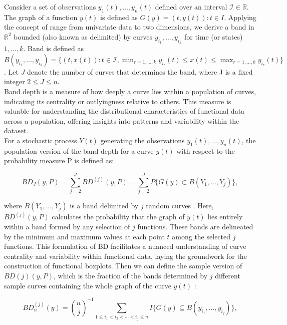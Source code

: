 \documentclass{article}\usepackage[]{graphicx}\usepackage[]{xcolor}
\numberwithin{equation}{section}
\begin{document}
\noindent
Consider a set of observations ${y_1(t),\dots,y_n(t)}$ defined over an interval $\mathcal{I} \in \mathbb{R}$. The graph of a function $y(t)$ is defined as $G(y) = {(t,y(t)) : t \in I}$. Applying the concept of range from univariate data to two dimensions, we derive a band in $\mathbb{R}^2$ bounded (also known as delimited) by curves $y_{i_1},\dots, y_{i_k}$ for time (or states) $1, \dots, k$. Band is defined as $B(y_{i_1},\dots,y_{i_k}) = \{(t,x(t)): t \in \mathcal{I}, \min_{r=1,\dots,k} y_{i_r}(t) \leq x(t) \leq \max_{r=1,\dots,k} y_{i_r}(t)\}$. Let $J$ denote the number of curves that determines the band, where J is a fixed integer $2 \le J \le n$.\\

\noindent
Band depth is a measure of how deeply a curve lies within a population of curves, indicating its centrality or outlyingness relative to others. This measure is valuable for understanding the distributional characteristics of functional data across a population, offering insights into patterns and variability within the dataset.\\

\noindent
For a stochastic process $Y(t)$ generating the observations $y_1(t), \dots, y_n(t)$, the population version of the band depth for a curve $y(t)$ with respect to the probability measure P is defined as:

\begin{equation}
BD_{J}(y, P) = \sum_{j=2}^{J} BD^{(j)}(y,P)=\sum_{j=2}^{J} P\{G(y) \subset B(Y_1,\dots,Y_j)\}, 
\end{equation}

\noindent
where $B(Y_1,\dots,Y_j)$ is a band delimited by $j$ random curves \cite{SunGenton2011FunctionalBoxplots}. Here, $BD^{(j)}(y,P)$ calculates the probability that the graph of $y(t)$ lies entirely within a band formed by any selection of $j$ functions. These bands are delineated by the minimum and maximum values at each point $t$ among the selected $j$ functions. This formulation of BD facilitates a nuanced understanding of curve centrality and variability within functional data, laying the groundwork for the construction of functional boxplots. Then we can define the sample version of $BD(j)(y,P)$, which is the fraction of the bands determined by $j$ different sample curves containing the whole graph of the curve $y(t)$ \cite{SunGenton2011FunctionalBoxplots}:

\[BD_{n}^{(j)}(y) = {\binom{n}{j}}^{-1} \sum_{1 \leq i_1 < i_2 < \cdots < i_j \leq n} I\{G(y) \subseteq B(y_{i_1}, \ldots, y_{i_j})\}, \]
\end{document}
